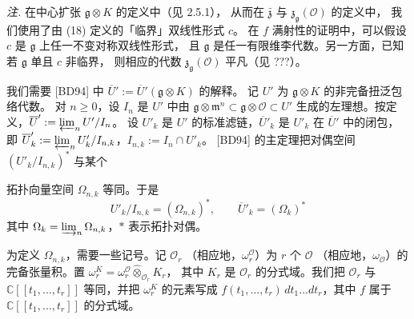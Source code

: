 \emph{注.} 在中心扩张 $\mathfrak{g}\otimes K$ 的定义中（见 2.5.1），
从而在 $\bar{\mathfrak{z}}$ 与 $\mathfrak{z}_{\mathfrak{g}}(\mathcal{O})$ 的定义中，
我们使用了由 (18) 定义的「临界」双线性形式 $c$。
在 $f$ 满射性的证明中，可以假设 $c$ 是 $\mathfrak{g}$ 上任一不变对称双线性形式，
且 $\mathfrak{g}$ 是任一有限维李代数。另一方面，已知若 $\mathfrak{g}$ 单且 $c$ 非临界，
则相应的代数 $\mathfrak{z}_{\mathfrak{g}}(\mathcal{O})$ 平凡（见 ???）。

 我们需要 [BD94] 中
$\overline{U}':=\overline{U}'(\mathfrak{g}\otimes K)$ 的解释。
记 $U'$ 为 $\mathfrak{g}\otimes K$ 的非完备扭泛包络代数。
对 $n\ge 0$，设 $I_n$ 是 $U'$ 中由
$\mathfrak{g}\otimes\mathfrak{m}^n\subset\mathfrak{g}\otimes\mathcal{O}\subset U'$
生成的左理想。按定义，$\overline{U}':=\varprojlim_n U'/I_n$。
设 $U'_k$ 是 $U'$ 的标准滤链，$\overline{U}'_k$ 是 $U'_k$ 在
$\overline{U}'$ 中的闭包，即
$\overline{U}'_k:=\varprojlim_n U'_k/I_{n,k}$，$I_{n,k}:=I_n\cap U'_k$。
[BD94] 的主定理把对偶空间 $(U'_k/I_{n,k})^*$ 与某个


拓扑向量空间 $\Omega_{n,k}$ 等同。于是
\begin{equation}\tag{30}
  U'_k/I_{n,k}=(\Omega_{n,k})^*,\qquad \overline{U}'_k=(\Omega_k)^*
\end{equation}
其中 $\Omega_k=\varinjlim_n\Omega_{n,k}$，$*$ 表示拓扑对偶。

为定义 $\Omega_{n,k}$，需要一些记号。记 $\mathcal{O}_r$
（相应地，$\omega^{\mathcal{O}}_r$）为 $r$ 个 $\mathcal{O}$
（相应地，$\omega_{\mathcal{O}}$）的完备张量积。置
$\omega^K_r=\omega^{\mathcal{O}}_r\widehat{\otimes}_{\mathcal{O}_r}K_r$，
其中 $K_r$ 是 $\mathcal{O}_r$ 的分式域。我们把 $\mathcal{O}_r$ 与
$\mathbb{C}[[t_1,\ldots,t_r]]$ 等同，并把 $\omega^K_r$ 的元素写成
$f(t_1,\ldots,t_r)\,dt_1\ldots dt_r$，其中 $f$ 属于
$\mathbb{C}[[t_1,\ldots,t_r]]$ 的分式域。

